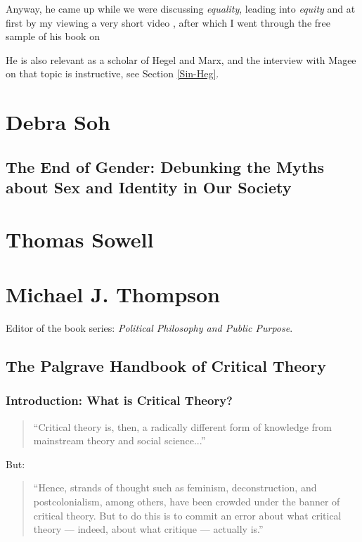 \documentclass[10pt,titlepage]{book}
\begin{document}
Anyway, he came up while we were discussing \emph{equality}, leading into \emph{equity} and at first by my viewing a very short video \cite{singer-eqvid}, after which I went through the free sample of his book on

He is also relevant as a scholar of Hegel and Marx, and the interview with Magee on that topic \cite{magee-singer} is instructive, see Section \ref{Sin-Heg}.

\section{Debra Soh}

\subsection{The End of Gender: Debunking the Myths about
Sex and Identity in Our Society \cite{soh-end}}

\section{Thomas Sowell}

\cite{sowell-barbarians}

\section{Michael J. Thompson}

Editor of the book series: \emph{Political Philosophy and Public Purpose}.

\subsection{The Palgrave Handbook of Critical Theory \cite{thompson-palcrit}}

\subsubsection{Introduction: What is Critical Theory?}

\begin{quotation}
``Critical theory is, then, a radically different form of knowledge from mainstream theory and social science...''
\end{quotation}

But:

\begin{quotation}
``Hence, strands of thought such as feminism, deconstruction, and postcolonialism, among others, have been crowded under the banner of critical theory. But to do this is to commit an error about what critical theory — indeed, about what critique — actually is.''
\end{quotation}
\end{document}
